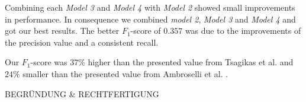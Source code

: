 Combining each \textit{Model 3} and \textit{Model 4} with \textit{Model 2} showed small improvements in performance. In consequence we combined \textit{model 2}, \textit{Model 3} and \textit{Model 4} and got our best results. The better $F_1$-score of $0.357$ was due to the improvements of the precision value and a consistent recall.

Our $F_1$-score was $37\%$ higher than the presented value from Tsagikas et al. \cite{tsagkias2009predicting} and $24\%$ smaller than the presented value from Ambroselli et al. \cite{ambroselli2018prediction}.

BEGRÜNDUNG \& RECHTFERTIGUNG

